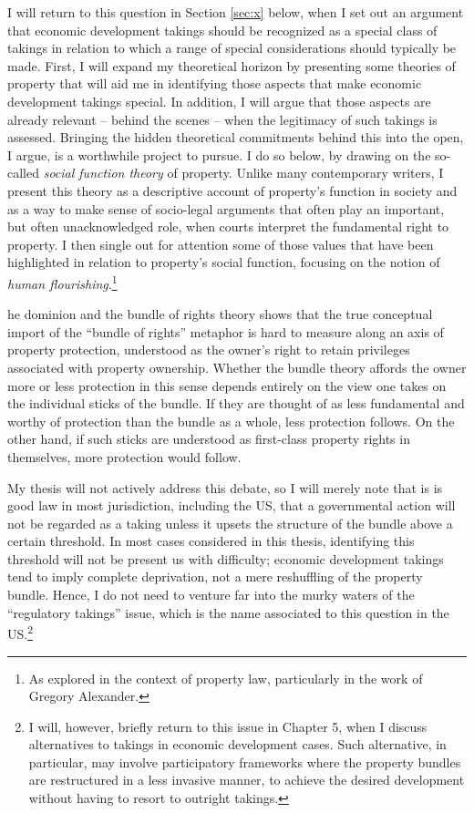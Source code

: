 I will return to this question in Section \ref{sec:x} below, when I set out an argument that economic development takings should be recognized as a special class of takings in relation to which a range of special considerations should typically be made. First, I will expand my theoretical horizon by presenting some theories of property that will aid me in identifying those aspects that make economic development takings special. In addition, I will argue that those aspects are already relevant -- behind the scenes -- when the legitimacy of such takings is assessed. Bringing the hidden theoretical commitments behind this into the open, I argue, is a worthwhile project to pursue. I do so below, by drawing on the so-called {\it social function theory} of property. Unlike many contemporary writers, I present this theory as a descriptive account of property's function in society and as a way to make sense of socio-legal arguments that often play an important, but often unacknowledged role, when courts interpret the fundamental right to property. I then single out for attention some of those values that have been highlighted in relation to property's social function, focusing on the notion of {\it human flourishing}.\footnote{As explored in the context of property law, particularly in the work of Gregory Alexander.}

he dominion and the bundle of rights theory shows that the true conceptual import of the ``bundle of rights'' metaphor is hard to measure along an axis of property protection, understood as the owner's right to retain privileges associated with property ownership. Whether the bundle theory affords the owner more or less protection in this sense depends entirely on the view one takes on the individual sticks of the bundle. If they are thought of as less fundamental and worthy of protection than the bundle as a whole, less protection follows. On the other hand, if such sticks are understood as first-class property rights in themselves, more protection would follow.

My thesis will not actively address this debate, so I will merely note that is is good law in most jurisdiction, including the US, that a governmental action will not be regarded as a taking unless it upsets the structure of the bundle above a certain threshold. In most cases considered in this thesis, identifying this threshold will not be present us with difficulty; economic development takings tend to imply complete deprivation, not a mere reshuffling of the property bundle. Hence, I do not need to venture far into the murky waters of the ``regulatory takings'' issue, which is the name associated to this question in the US.\footnote{I will, however, briefly return to this issue in Chapter 5, when I discuss alternatives to takings in economic development cases. Such alternative, in particular, may involve participatory frameworks where the property bundles are restructured in a less invasive manner, to achieve the desired development without having to resort to outright takings.}

